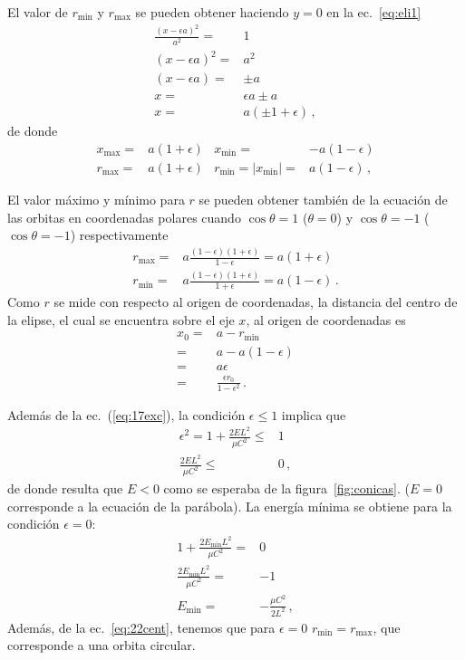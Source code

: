 El valor de $r_{\text{min}}$ y $r_{\text{max}}$ se pueden obtener haciendo $y=0$ en la ec.~\eqref{eq:eli1}
\begin{align}
  \frac{(x-\epsilon a)^2}{a^2}=&1\nonumber\\
  (x-\epsilon a)^2=&a^2\nonumber\\
  (x-\epsilon a)=&\pm a\nonumber\\
  x=&\epsilon a\pm a\nonumber\\
  x=&a(\pm 1+\epsilon)\,,
\end{align}
de donde
\begin{align}
  x_{\text{max}}=&a(1+\epsilon)&x_{\text{min}}=&-a(1-\epsilon)\nonumber\\
  r_{\text{max}}=&a(1+\epsilon)&r_{\text{min}}=|x_{\text{min}}|=&a(1-\epsilon)\,,
\end{align}







El valor máximo y mínimo para $r$ se pueden obtener también de la ecuación de las orbitas en coordenadas polares cuando $\cos\theta=1$ ($\theta=0$) y $\cos\theta=-1$ ($\cos\theta=-1$) respectivamente
\begin{align}
  \label{eq:22cent}
  r_{\text{max}}=&a\frac{(1-\epsilon)(1+\epsilon)}{1-\epsilon}=a(1+\epsilon)\nonumber\\
  r_{\text{min}}=&a\frac{(1-\epsilon)(1+\epsilon)}{1+\epsilon}=a(1-\epsilon)\,.
\end{align}
Como $r$ se mide con respecto al origen de coordenadas, la distancia del centro de la elipse, el cual se encuentra sobre el eje $x$, al origen de coordenadas es
\begin{align}
\label{eq:15}
  x_0=&a-r_{\text{min}}\nonumber\\
  =&a-a(1-\epsilon)\nonumber\\
  =&a\epsilon\nonumber\\
  =&\frac{\epsilon r_0}{1-\epsilon^2}\,.
\end{align}

Además de la ec.~(\ref{eq:17exc}), la condición $\epsilon\le 1$ implica que
\begin{align}
  \epsilon^2=1+\frac{2EL^2}{\mu C^2}\le&1\nonumber\\
  \frac{2EL^2}{\mu C^2}\le&0\,,
\end{align}
de donde resulta que $E<0$ como se esperaba de la figura~\ref{fig:conicas}. ($E=0$ corresponde a la ecuación de la parábola). La energía mínima se obtiene para la condición $\epsilon=0$:
\begin{align}
  1+\frac{2E_{\text{min}}L^2}{\mu C^2}=&0\nonumber\\
  \frac{2E_{\text{min}}L^2}{\mu C^2}=&-1\nonumber\\
  E_{\text{min}}=&-\frac{\mu C^2}{2L^2}\,,
\end{align}
Además, de la ec.~\eqref{eq:22cent}, tenemos que para $\epsilon=0$ $r_{\text{min}}=r_{\text{max}}$, que corresponde a una orbita circular.

